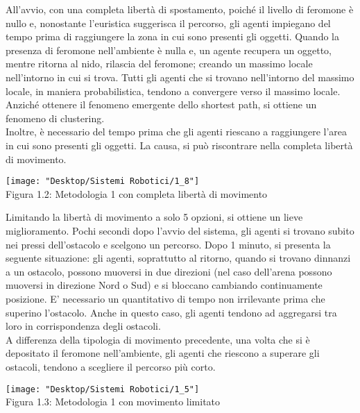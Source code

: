 \documentclass[12pt,a4paper,openright,twoside]{report}
\begin{document}
All'avvio, con una completa libertà di spostamento, poiché il livello di feromone è nullo e, nonostante l'euristica suggerisca il percorso, gli agenti impiegano del tempo prima di raggiungere la zona in cui sono presenti gli oggetti. Quando la presenza di feromone nell'ambiente è nulla e, un agente recupera un oggetto, mentre ritorna al nido, rilascia del feromone; creando un massimo locale nell'intorno in cui si trova. Tutti gli agenti che si trovano nell'intorno del massimo locale, in maniera probabilistica, tendono a convergere verso il massimo locale. Anziché ottenere il fenomeno emergente dello shortest path, si ottiene un fenomeno di clustering.\\
Inoltre, è necessario del tempo prima che gli agenti riescano a raggiungere l'area in cui sono presenti gli oggetti. La causa, si può riscontrare nella completa libertà di movimento.\\

\begin{center}  
	\texttt{[image: "Desktop/Sistemi Robotici/1\_8"]}
	\\Figura 1.2: Metodologia 1 con completa libertà di movimento
\end{center}

Limitando la libertà di movimento a solo 5 opzioni, si ottiene un lieve miglioramento. Pochi secondi dopo l'avvio del sistema, gli agenti si trovano subito nei pressi dell'ostacolo e scelgono un percorso. Dopo 1 minuto, si presenta la seguente situazione: gli agenti, soprattutto al ritorno, quando si trovano dinnanzi a un ostacolo, possono muoversi in due direzioni (nel caso dell'arena possono muoversi in direzione Nord o Sud) e si bloccano cambiando continuamente posizione. E' necessario un quantitativo di tempo non irrilevante prima che superino l'ostacolo. Anche in questo caso, gli agenti tendono ad aggregarsi tra loro in corrispondenza degli ostacoli.\\ A differenza della tipologia di movimento precedente, una volta che si è depositato il feromone nell'ambiente, gli agenti che riescono a superare gli ostacoli, tendono a scegliere il percorso più corto.\\

\begin{center}  
	\texttt{[image: "Desktop/Sistemi Robotici/1\_5"]}
	\\Figura 1.3: Metodologia 1 con movimento limitato
\end{center}
\end{document}
